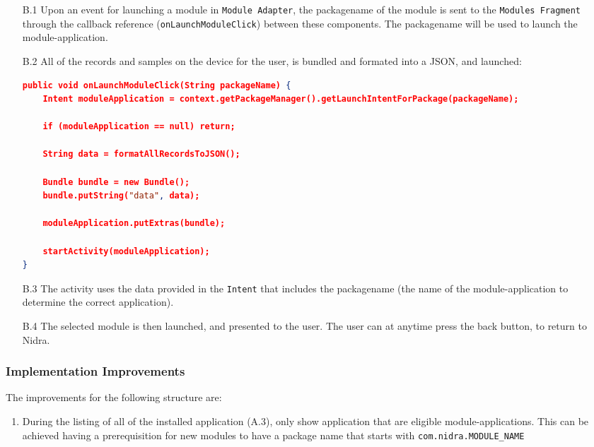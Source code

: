 \begin{itemize}
    \item[B.1] Upon an event for launching a module in \verb|Module Adapter|, the packagename of the module is sent to the \verb|Modules Fragment| through the callback reference (\verb|onLaunchModuleClick|) between these components. The packagename  will be used to launch the module-application.
    \item[B.2] All of the records and samples on the device for the user, is bundled and formated into a JSON, and launched:
\begin{lstlisting}[language=json, caption={My Caption}, captionpos=b]
public void onLaunchModuleClick(String packageName) {
    Intent moduleApplication = context.getPackageManager().getLaunchIntentForPackage(packageName);

    if (moduleApplication == null) return;

    String data = formatAllRecordsToJSON();

    Bundle bundle = new Bundle();
    bundle.putString("data", data);

    moduleApplication.putExtras(bundle);

    startActivity(moduleApplication);
}
\end{lstlisting}

    \item[B.3] The activity uses the data provided in the \verb|Intent| that includes the packagename (the name of the module-application to determine the correct application).
    \item[B.4] The selected module is then launched, and presented to the user. The user can at anytime press the back button, to return to Nidra.  
\end{itemize}

\subsubsection{Implementation Improvements}
The improvements for the following structure are:
\begin{enumerate}
    \item During the listing of all of the installed application (A.3), only show application that are eligible module-applications. This can be achieved having a prerequisition for new modules to have a package name that starts with \verb|com.nidra.MODULE_NAME|
\end{enumerate}






